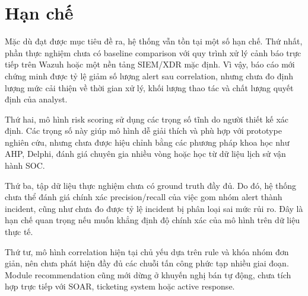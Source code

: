 \documentclass[a4paper,12pt,oneside]{book}
\begin{document}
\section{Hạn chế}
{\fontsize{13pt}{15.6pt}\selectfont

Mặc dù đạt được mục tiêu đề ra, hệ thống vẫn tồn tại một số hạn chế. Thứ nhất, phần thực nghiệm chưa có baseline comparison với quy trình xử lý cảnh báo trực tiếp trên Wazuh hoặc một nền tảng SIEM/XDR mặc định. Vì vậy, báo cáo mới chứng minh được tỷ lệ giảm số lượng alert sau correlation, nhưng chưa đo định lượng mức cải thiện về thời gian xử lý, khối lượng thao tác và chất lượng quyết định của analyst.

\noindent Thứ hai, mô hình risk scoring sử dụng các trọng số tĩnh do người thiết kế xác định. Các trọng số này giúp mô hình dễ giải thích và phù hợp với prototype nghiên cứu, nhưng chưa được hiệu chỉnh bằng các phương pháp khoa học như AHP, Delphi, đánh giá chuyên gia nhiều vòng hoặc học từ dữ liệu lịch sử vận hành SOC.

\noindent Thứ ba, tập dữ liệu thực nghiệm chưa có ground truth đầy đủ. Do đó, hệ thống chưa thể đánh giá chính xác precision/recall của việc gom nhóm alert thành incident, cũng như chưa đo được tỷ lệ incident bị phân loại sai mức rủi ro. Đây là hạn chế quan trọng nếu muốn khẳng định độ chính xác của mô hình trên dữ liệu thực tế.

\noindent Thứ tư, mô hình correlation hiện tại chủ yếu dựa trên rule và khóa nhóm đơn giản, nên chưa phát hiện đầy đủ các chuỗi tấn công phức tạp nhiều giai đoạn. Module recommendation cũng mới dừng ở khuyến nghị bán tự động, chưa tích hợp trực tiếp với SOAR, ticketing system hoặc active response.

}
\end{document}
